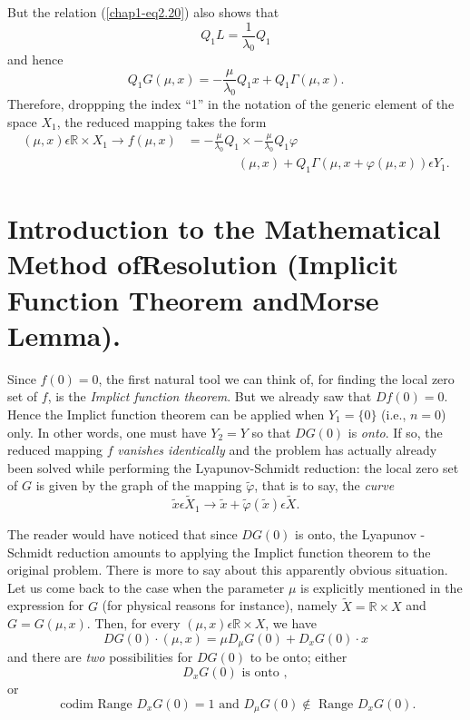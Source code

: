 But the relation (\ref{chap1-eq2.20}) also shows that
\begin{equation*}
Q_{1} L = \frac{1}{\lambda_{0}} Q_{1}\tag{2.21}\label{chap1-eq2.21}
\end{equation*}
and hence
$$
Q_{1} G(\mu, x) = - \frac{\mu}{\lambda_{0}} Q_{1} x + Q_{1}\Gamma(\mu, x).
$$
Therefore, droppping the index ``1'' in the notation of the generic element of the space $X_1$, the reduced mapping takes the form 
\begin{align*}
(\mu, x) \epsilon \mathbb{R} \times X_{1} \to f(\mu, x) &=
  -\frac{\mu}{\lambda_{0}} Q_{1} \times -\frac{\mu}{\lambda_{0}} Q_{1}
  \varphi\\
&\qquad\qquad (\mu, x) + Q_{1}\Gamma(\mu, x + \varphi (\mu, x)) \epsilon Y_{1}.\tag{2.22}\label{chap1-eq2.22}
\end{align*}

\section[Introduction to the Mathematical Method......]{Introduction
  to the Mathematical Method of\hfil\break Resolution (Implicit Function Theorem
  and\hfil\break Morse Lemma).}\label{chap1-sec3} 

Since $f(0) = 0$, the first natural tool we can think of, for finding the local zero set of $f$, is the {\em Implict function theorem}. But we already saw that $Df(0) = 0$. Hence the Implict function theorem can be applied when $Y_{1} = \{0\}$ (i.e., $n = 0$) only. In other words, one must have $Y_{2} = Y$ so that $DG(0)$ is {\em onto}. If so, the reduced mapping $f$ {\em vanishes identically} and the problem has actually already been solved while performing the Lyapunov-Schmidt reduction: the local zero set of $G$ is given by the graph of the mapping $\widetilde{\varphi}$, that is to say, the {\em curve}
$$
\widetilde{x} \epsilon \widetilde{X}_{1} \to \widetilde{x} + \widetilde{\varphi}(\widetilde{x}) \epsilon \widetilde{X}. 
$$\pageoriginale
 
The reader would have noticed that since $DG(0)$ is onto, the Lyapunov
- Schmidt reduction amounts to applying the Implict function theorem to the original problem. There is more to say about this apparently obvious situation. Let us come back to the case when the parameter $\mu$ is explicitly mentioned in the expression for $G$ (for physical reasons for instance), namely $\widetilde{X} = \mathbb{R} \times X$ and $G = G(\mu, x)$. Then, for every $(\mu, x) \epsilon \mathbb{R} \times X$, we have
\begin{equation*}
DG(0) \cdot (\mu, x) = \mu D_{\mu}G(0) + D_{x}G(0) \cdot x\tag{3.1}\label{chap1-eq3.1}
\end{equation*}
and there are {\em two} possibilities for $DG(0)$ to be onto; either
\begin{equation*}
D_{x}G(0) \text{ is onto },\tag{3.2}\label{chap1-eq3.2}
\end{equation*}
or
\begin{equation*}
\text{ codim Range } D_{x}G(0) = 1 \text{ and } D_{\mu}G(0) \notin \text{ Range } D_{x}G(0).\tag{3.3}\label{chap1-eq3.3}
\end{equation*}

